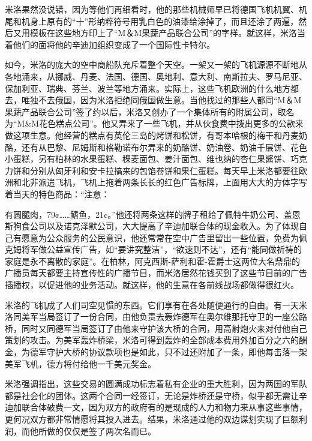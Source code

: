     米洛果然没说错，因为等他们再细看时，他的那些机械师早已将德国飞机机翼、机尾和机身上原有的“十”形纳粹符号用乳白色的油漆给涂掉了，而且还涂了两遍，然后又用模板在这些地方印上了“M＆M果蔬产品联合公司”的字样。就这样，米洛当着他们的面将他的辛迪加组织变成了一个国际性卡特尔。

 


    如今，米洛的庞大的空中商船队充斥着整个天空。一架又一架的飞机源源不断地从各地涌来，从挪威、丹麦、法国、德国、奥地利、意大利、南斯拉夫、罗马尼亚、保加利亚、瑞典、芬兰、波兰等地方涌来。实际上，这些飞机欧洲的什么地方都去，唯独不去俄国，因为米洛拒绝同俄国做生意。当他找过的那些人都同“M＆M果蔬产品联合公司”签了约以后，米洛又创办了一个集体所有的附属公司，取名为“M&M花色糕点公司”。他又弄来了一些飞机，并从伙食费中拨出更多的公款来做这项生意。他经营的糕点有英伦三岛的烤饼和松饼，有哥本哈根的梅干和丹麦奶酪，还有从巴黎、尼姆斯和格勒诺布尔弄来的奶酪饼、奶油卷、奶油千层饼、花色小蛋糕，另有柏林的水果蛋糕、稞麦面包、姜汁面包、维也纳的杏仁果酱饼、巧克力饼和分别从匈牙利和安卡拉搞来的包馅卷饼和果仁蛋糕。每天早上米洛都要往欧洲和北非派遣飞机，飞机上拖着两条长长的红色广告标牌，上面用大大的方体字写着当天的特色商品：“注意：

    有圆腿肉，79¢……鳍鱼，21¢。”他还将两条这样的牌子租给了佩特牛奶公司、盖恩斯狗食公司以及诺克泽默公司，大大提高了辛迪加联合体的现金收入。为了体现自己有愿意为公众服务的公民意识，他还常常在空中广告里留出一些位置，免费为佩克姆将军做公益宣传广告，如“要讲究整洁”，“欲速则不达”，还有“能同做祈祷的家庭是永不离散的家庭”。在柏林，阿克西斯-萨利和霍-霍爵士这两位大名鼎鼎的广播员每天都要主持宣传性的广播节目，而米洛居然花钱买到了这些节目前的广告插播权，以促进他的业务活动。就这样，他的生意在各前线战场都做得很红火。

    米洛的飞机成了人们司空见惯的东西。它们享有在各处随便通行的自由。有一天米洛同美军当局签订了一份合同，由他负责去轰炸德军在奥尔维那托守卫的一座公路桥，同时又同德军当局签订了由他来守护该大桥的合同，用高射炮火来对付他自己策划的攻击。为美军轰炸桥梁，米洛可得到轰炸的全部成本费用外加百分之六的酬金，为德军守护大桥的协议款项也是如此，只不过还附加了一条，即他每击落一架美军飞机，德方将付给他一千美元奖金。
 


    米洛强调指出，这些交易的圆满成功标志着私有企业的重大胜利，因为两国的军队都是社会化的团体。这两个合同一经签订，无论是炸桥还是守桥，似乎都无需让辛迪加联合体破费一文，因为双方的政府有的是现成的人力和物力来从事这些事情，更何况双方都非常情愿将其投入进去。结果，米洛通过他的双边谋划实现了巨额利润，而他所做的仅仅是签了两次名而已。

